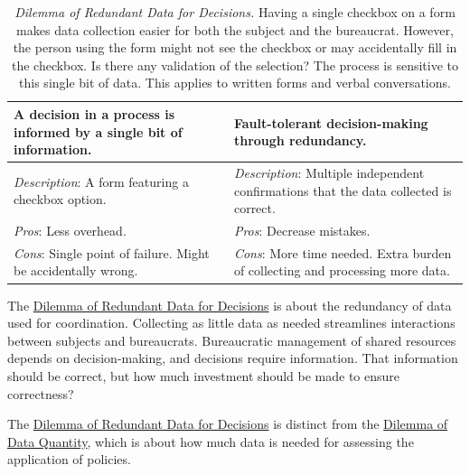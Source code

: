 \begin{center}
\begin{table}[H] %
\begin{tabular}{ | m{\dilemmatablewidth}| m{\dilemmatablewidth} | } 
  \hline
  \textbf{A decision in a process is informed by a single bit of information.} & 
  \textbf{Fault-tolerant decision-making through redundancy.} \\ 
  \hline
  \textit{Description}: A form featuring a checkbox option. & 
  \textit{Description}: Multiple independent confirmations that the data collected is correct.  \\
  \hline
  \textit{Pros}: Less overhead. & 
  \textit{Pros}: Decrease mistakes. \\
  \hline
  \textit{Cons}: Single point of failure. Might be accidentally wrong. &
  \textit{Cons}: More time needed. Extra burden of collecting and processing more data. \\  
  \hline
\end{tabular}
\caption{
\textit{Dilemma of Redundant Data for Decisions.}
Having a single checkbox on a form makes data collection easier for both the subject and the bureaucrat. However, the person using the form might not see the checkbox or may accidentally fill in the checkbox. Is there any validation of the selection? The process is sensitive to this single bit of data. This applies to written forms and verbal conversations. 
}
\label{table:dilemma-personal-single-bit-decision}
\end{table}
\end{center}

The \hyperref[table:dilemma-personal-single-bit-decision]{Dilemma of Redundant Data for Decisions} is about the redundancy of data used for coordination. Collecting as little data as needed streamlines interactions between subjects and bureaucrats. Bureaucratic management of shared resources depends on decision-making, and decisions require information. That information should be correct, but how much investment should be made to ensure correctness?

The \hyperref[table:dilemma-personal-single-bit-decision]{Dilemma of Redundant Data for Decisions} is distinct from the \hyperref[table:dilemma-personal-gather-data-lots-vs-little]{Dilemma of Data Quantity}, which is about how much data is needed for assessing the application of policies.

